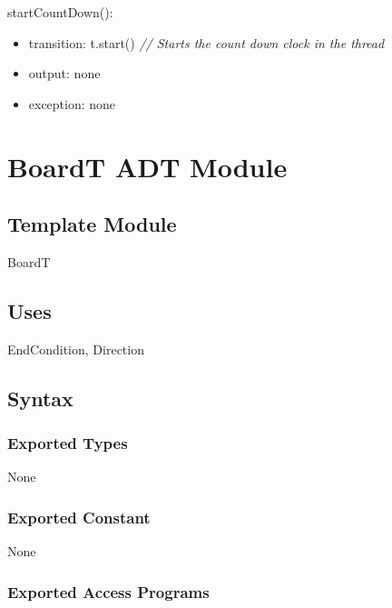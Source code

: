 \documentclass[12pt]{article}
\begin{document}
\noindent startCountDown():
\begin{itemize}
  \item transition: t.start() \quad \textit{// Starts the count down clock in the thread}
  \item output: none
  \item exception: none
\end{itemize}


\newpage

\section* {BoardT ADT Module}

\subsection*{Template Module}

BoardT

\subsection* {Uses}

EndCondition, Direction

\subsection* {Syntax}

\subsubsection* {Exported Types}

None

\subsubsection* {Exported Constant}

None

\subsubsection* {Exported Access Programs}
\end{document}

